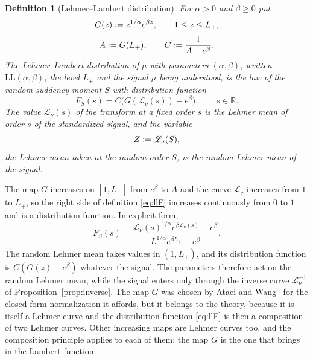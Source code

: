 \documentclass[sn-mathphys-num]{sn-jnl}\newcommand{\SNJNL}{}
\theoremstyle{thmstyleone}
\theoremstyle{thmstyletwo}
\theoremstyle{thmstylethree}
\newtheorem{definition}{Definition}
\theoremstyle{thmstyleone}
\providecommand{\R}{\mathbb{R}}
\providecommand{\Leh}{\mathscr{L}}
\providecommand{\eqdef}{\mathrel{\vcentcolon=}}
\providecommand{\LL}{\mathrm{LL}}
\begin{document}
	\begin{definition}[Lehmer--Lambert distribution]\label{def:ll}
		For $\alpha>0$ and $\beta\ge0$ put
		\begin{equation}\label{eq:G}
			G(z)\eqdef z^{1/\alpha}e^{\beta z},
			\qquad 1\le z\le L_+ ,
		\end{equation}
		\begin{equation}\label{eq:AC}
			A\eqdef G(L_+),
			\qquad
			C\eqdef\frac{1}{A-e^{\beta}} .
		\end{equation}
		The \emph{Lehmer--Lambert distribution} of $\mu$ with parameters
		$(\alpha,\beta)$, written $\LL(\alpha,\beta)$, the level $L_+$ and
		the signal $\mu$ being understood, is the law of the random suddency
		moment $S$ with distribution function
		\begin{equation}\label{eq:llF}
			F_S(s)=C\bigl(G(\Leh_\nu(s))-e^{\beta}\bigr),
			\qquad s\in\R .
		\end{equation}
		The value $\Leh_\nu(s)$ of the transform at a fixed order $s$ is the
		Lehmer mean of order $s$ of the standardized signal, and the
		variable
		\begin{equation}\label{eq:Zdef}
			Z\eqdef\Leh_\nu(S),
		\end{equation}
		the Lehmer mean taken at the random order $S$, is the \emph{random
			Lehmer mean} of the signal.
	\end{definition}
	
	The map $G$ increases on $[1,L_+]$ from $e^{\beta}$ to $A$ and the
	curve $\Leh_\nu$ increases from $1$ to $L_+$, so the right side of
	definition \eqref{eq:llF} increases continuously from $0$ to $1$ and is a
	distribution function. In explicit form,
	\begin{equation}\label{eq:llFexplicit}
		F_S(s)=\frac{\Leh_\nu(s)^{1/\alpha}e^{\beta\Leh_\nu(s)}-e^{\beta}}
		{L_+^{1/\alpha}e^{\beta L_+}-e^{\beta}} .
	\end{equation}
	The random Lehmer mean takes values in $(1,L_+)$, and its
	distribution function is $C(G(z)-e^{\beta})$ whatever the signal.
	The parameters therefore act on the random Lehmer mean, while the
	signal enters only through the inverse curve $\Leh_\nu^{-1}$ of
	Proposition~\ref{prop:inverse}. The map $G$ was chosen by
	Ataei and Wang~\cite{ataei2022} for the closed-form normalization it
	affords, but it belongs to the theory, because it is itself a
	Lehmer curve and the distribution function \eqref{eq:llF} is then a
	composition of two Lehmer curves. Other increasing maps are Lehmer
	curves too, and the composition principle applies to each of them;
	the map $G$ is the one that brings in the Lambert function.
	
\end{document}
